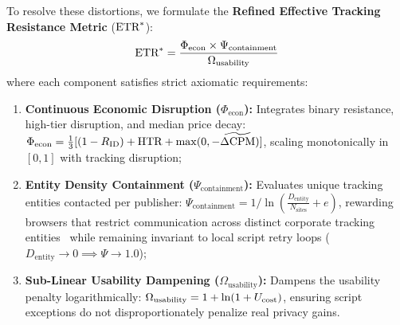 To resolve these distortions, we formulate the \textbf{Refined Effective Tracking Resistance Metric} ($\etr$):
\begin{equation}
\text{ETR}^* = \frac{\Phi_{\text{econ}} \times \Psi_{\text{containment}}}{\Omega_{\text{usability}}}
\label{eq:etr_refined}
\end{equation}
where each component satisfies strict axiomatic requirements:
\begin{enumerate}
    \item \textbf{Continuous Economic Disruption ($\Phi_{\text{econ}}$):} Integrates binary resistance, high-tier disruption, and median price decay: $\Phi_{\text{econ}} = \frac{1}{3} [(1 - R_{\text{ID}}) + \text{HTR} + \max(0, -\widetilde{\Delta\text{CPM}})]$, scaling monotonically in $[0, 1]$ with tracking disruption;
    \item \textbf{Entity Density Containment ($\Psi_{\text{containment}}$):} Evaluates unique tracking entities contacted per publisher: $\Psi_{\text{containment}} = 1 / \ln(\frac{D_{\text{entity}}}{N_{\text{sites}}} + e)$, rewarding browsers that restrict communication across distinct corporate tracking entities~\cite{bashir2016tracing, cook2020inferring} while remaining invariant to local script retry loops ($D_{\text{entity}} \to 0 \implies \Psi \to 1.0$);
    \item \textbf{Sub-Linear Usability Dampening ($\Omega_{\text{usability}}$):} Dampens the usability penalty logarithmically: $\Omega_{\text{usability}} = 1 + \ln(1 + U_{\text{cost}})$, ensuring script exceptions do not disproportionately penalize real privacy gains.
\end{enumerate}

\begin{table}[t]
\centering
\small
\caption{Decomposition of Refined Metric Components ($\etr$). Deduplicated tracking host density restores monotonically sound defense rankings.}
\label{tab:etr_breakdown}
\end{table}

